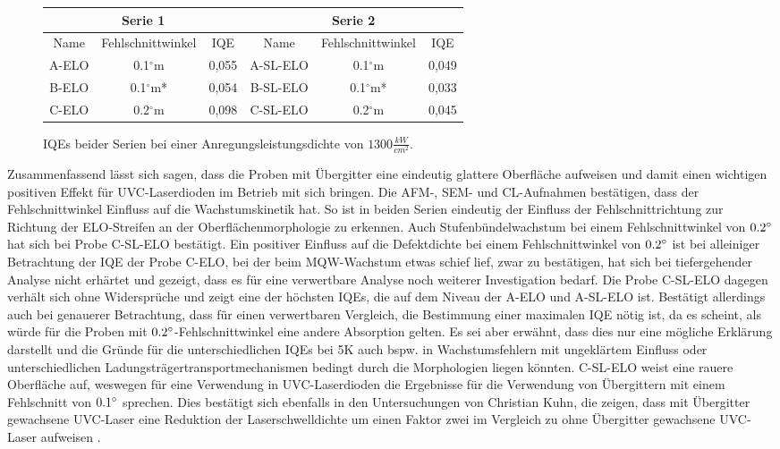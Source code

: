 \begin{figure}[H]
\centering
\begin{tabular}{ |c|c|c|c|c|c|   }
\hline
\multicolumn{3}{|c|}{Serie 1} & \multicolumn{3}{c|}{Serie 2}  \\
\hline
Name & Fehlschnittwinkel & IQE & Name & Fehlschnittwinkel & IQE \\
\hline
A-ELO & 0.1$^\circ$m & 0,055 & A-SL-ELO & 0.1$^\circ$m & 0,049  \\
B-ELO & 0.1$^\circ$m*& 0,054& B-SL-ELO & 0.1$^\circ$m* & 0,033 \\
C-ELO & 0.2$^\circ$m & 0,098& C-SL-ELO & 0.2$^\circ$m & 0,045 \\
\hline
\end{tabular}
\caption{IQEs beider Serien bei einer Anregungsleistungsdichte von $ 1300 \frac{kW}{cm^2} $.}
\end{figure}
\noindent 
Zusammenfassend lässt sich sagen, dass die Proben mit Übergitter eine eindeutig glattere Oberfläche aufweisen und damit einen wichtigen positiven Effekt für UVC-Laserdioden im Betrieb mit sich bringen. Die AFM-, SEM- und CL-Aufnahmen bestätigen, dass der Fehlschnittwinkel Einfluss auf die Wachstumskinetik hat. 
\noindent 
So ist in beiden Serien eindeutig der Einfluss der Fehlschnittrichtung zur Richtung der ELO-Streifen an der Oberflächenmorphologie zu erkennen. Auch Stufenbündelwachstum bei einem Fehlschnittwinkel von $0.2\degree$ hat sich bei Probe C-SL-ELO bestätigt. Ein positiver Einfluss auf die Defektdichte bei einem Fehlschnittwinkel von $0.2 \degree$ ist bei alleiniger Betrachtung der IQE der Probe C-ELO, bei der beim MQW-Wachstum etwas schief lief, zwar zu bestätigen, hat sich bei tiefergehender Analyse nicht erhärtet und gezeigt, dass es für eine verwertbare Analyse noch weiterer Investigation bedarf. 
\noindent 
Die Probe C-SL-ELO dagegen verhält sich ohne Widersprüche und zeigt eine der höchsten IQEs, die auf dem Niveau der A-ELO und A-SL-ELO ist. Bestätigt allerdings auch bei genauerer Betrachtung, dass für einen verwertbaren Vergleich, die Bestimmung einer maximalen IQE nötig ist, da es scheint, als würde für die Proben mit $0.2\degree$-Fehlschnittwinkel eine andere Absorption gelten. Es sei aber erwähnt, dass dies nur eine mögliche Erklärung darstellt und die Gründe für die unterschiedlichen IQEs bei 5K auch bspw. in Wachstumsfehlern mit ungeklärtem Einfluss oder unterschiedlichen Ladungsträgertransportmechanismen bedingt durch die Morphologien liegen könnten.
\noindent 
C-SL-ELO weist eine rauere Oberfläche auf, weswegen für eine Verwendung in UVC-Laserdioden die Ergebnisse für die Verwendung von Übergittern mit einem Fehlschnitt von $0.1\degree$ sprechen.
Dies bestätigt sich ebenfalls in den Untersuchungen von Christian Kuhn, die zeigen, dass mit Übergitter gewachsene UVC-Laser eine Reduktion der Laserschwelldichte um einen Faktor zwei im Vergleich zu ohne Übergitter gewachsene UVC-Laser aufweisen \cite{doi:10.1002/pssa.201870032}.